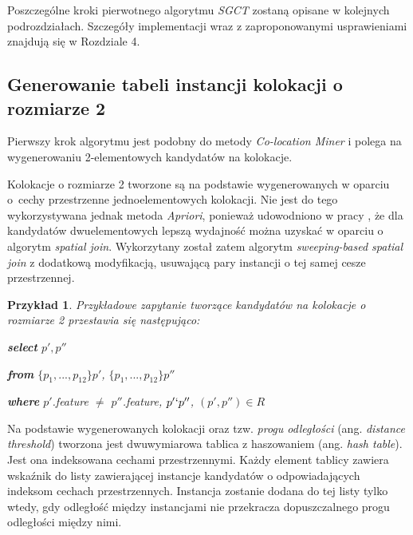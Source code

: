 \documentclass[12pt]{article}
\newtheorem{sample}{Przykład}
\begin{document}
Poszczególne kroki pierwotnego algorytmu \textit{SGCT} zostaną opisane w kolejnych podrozdziałach. Szczegóły implementacji wraz z zaproponowanymi usprawieniami znajdują się w Rozdziale 4.

\subsection{Generowanie tabeli instancji kolokacji o rozmiarze 2}

Pierwszy krok algorytmu jest podobny do metody \textit{Co-location Miner} i polega na wygenerowaniu 2-elementowych kandydatów na kolokacje. 

Kolokacje o rozmiarze 2 tworzone są na podstawie wygenerowanych w oparciu o~cechy przestrzenne jednoelementowych kolokacji. Nie jest do tego wykorzystywana jednak metoda \textit{Apriori}, ponieważ udowodniono w pracy \cite{huang}, że dla kandydatów dwuelementowych lepszą wydajność można uzyskać w oparciu o algorytm \textit{spatial join}. Wykorzytany został zatem algorytm \textit{sweeping-based spatial join} \cite{spatial} z dodatkową modyfikacją, usuwającą pary instancji o tej samej cesze przestrzennej. 

\begin{sample}Przykładowe zapytanie tworzące kandydatów na kolokacje o rozmiarze 2 przestawia się następująco:

\textbf{select} $ p', p''$

\textbf{from} $ \{p_{1},...,p_{12}\} p' $, $ \{p_{1},...,p_{12}\} p''$

\textbf{where}  $ p' $.feature $ \neq $ $ p'' $.feature, $ p' \lq p'' $, $(p', p'') \in R$
\end{sample}

Na podstawie wygenerowanych kolokacji oraz tzw. \textit{progu odległości} (ang. \textit{distance threshold}) tworzona jest dwuwymiarowa tablica z haszowaniem (ang. \textit{hash table}). Jest ona indeksowana cechami przestrzennymi. Każdy element tablicy zawiera wskaźnik do listy zawierającej instancje kandydatów o odpowiadających indeksom cechach przestrzennych. Instancja zostanie dodana do tej listy tylko wtedy, gdy odległość między instancjami nie przekracza dopuszczalnego progu odległości między nimi.

\end{document}
